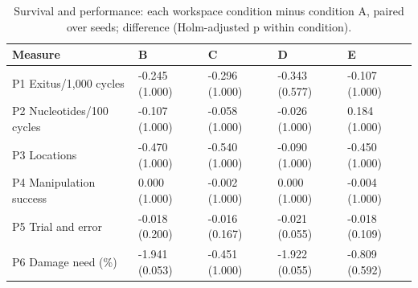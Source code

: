 \begin{table}[t]
\centering
\caption{Survival and performance: each workspace condition minus condition A, paired over seeds; difference (Holm-adjusted p within condition).}
\label{tab:T2}
\begin{tabular}{lllll}
\toprule
Measure & B & C & D & E \\
\midrule
P1 Exitus/1,000 cycles & -0.245 (1.000) & -0.296 (1.000) & -0.343 (0.577) & -0.107 (1.000) \\
P2 Nucleotides/100 cycles & -0.107 (1.000) & -0.058 (1.000) & -0.026 (1.000) & 0.184 (1.000) \\
P3 Locations & -0.470 (1.000) & -0.540 (1.000) & -0.090 (1.000) & -0.450 (1.000) \\
P4 Manipulation success & 0.000 (1.000) & -0.002 (1.000) & 0.000 (1.000) & -0.004 (1.000) \\
P5 Trial and error & -0.018 (0.200) & -0.016 (0.167) & -0.021 (0.055) & -0.018 (0.109) \\
P6 Damage need (\%) & -1.941 (0.053) & -0.451 (1.000) & -1.922 (0.055) & -0.809 (0.592) \\
\bottomrule
\end{tabular}
\end{table}

